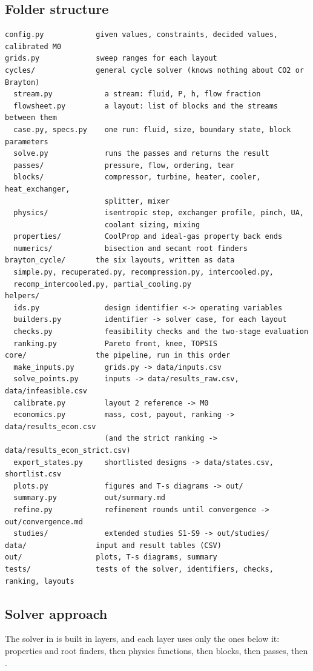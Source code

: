 \subsection{Folder structure}
{\small
\begin{verbatim}
config.py            given values, constraints, decided values, calibrated M0
grids.py             sweep ranges for each layout
cycles/              general cycle solver (knows nothing about CO2 or Brayton)
  stream.py            a stream: fluid, P, h, flow fraction
  flowsheet.py         a layout: list of blocks and the streams between them
  case.py, specs.py    one run: fluid, size, boundary state, block parameters
  solve.py             runs the passes and returns the result
  passes/              pressure, flow, ordering, tear
  blocks/              compressor, turbine, heater, cooler, heat_exchanger,
                       splitter, mixer
  physics/             isentropic step, exchanger profile, pinch, UA,
                       coolant sizing, mixing
  properties/          CoolProp and ideal-gas property back ends
  numerics/            bisection and secant root finders
brayton_cycle/       the six layouts, written as data
  simple.py, recuperated.py, recompression.py, intercooled.py,
  recomp_intercooled.py, partial_cooling.py
helpers/
  ids.py               design identifier <-> operating variables
  builders.py          identifier -> solver case, for each layout
  checks.py            feasibility checks and the two-stage evaluation
  ranking.py           Pareto front, knee, TOPSIS
core/                the pipeline, run in this order
  make_inputs.py       grids.py -> data/inputs.csv
  solve_points.py      inputs -> data/results_raw.csv, data/infeasible.csv
  calibrate.py         layout 2 reference -> M0
  economics.py         mass, cost, payout, ranking -> data/results_econ.csv
                       (and the strict ranking -> data/results_econ_strict.csv)
  export_states.py     shortlisted designs -> data/states.csv, shortlist.csv
  plots.py             figures and T-s diagrams -> out/
  summary.py           out/summary.md
  refine.py            refinement rounds until convergence -> out/convergence.md
  studies/             extended studies S1-S9 -> out/studies/
data/                input and result tables (CSV)
out/                 plots, T-s diagrams, summary
tests/               tests of the solver, identifiers, checks, ranking, layouts
\end{verbatim}}

\subsection{Solver approach}
The solver in  is built in layers, and each layer uses only the ones below it: properties and root finders, then physics functions, then blocks, then passes, then .

